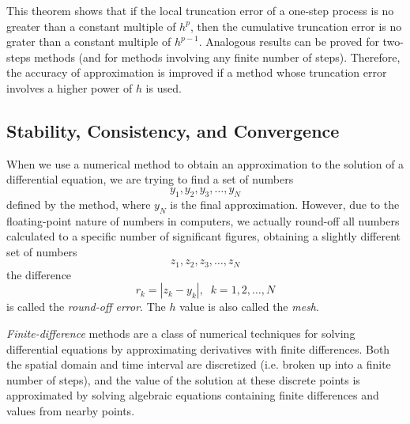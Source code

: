 \documentclass{article}
\newcounter{theorem}[section]
\newcounter{definition}[section]
\begin{document}
    This theorem shows that if the local truncation error of a one-step process is no greater than a constant multiple of $h^p$, then the cumulative truncation error is no grater than a constant multiple of $h^{p-1}$. Analogous results can be proved for two-steps methods (and for methods involving any finite number of steps). Therefore, the accuracy of approximation is improved if a method whose truncation error involves a higher power of $h$ is used. 

  \subsection{Stability, Consistency, and Convergence}

    \begin{definition}
      \label{def:round-off-errors}
    When we use a numerical method to obtain an approximation to the solution of a differential equation, we are trying to find a set of numbers 
    \begin{equation}
      y_1, y_2, y_3, \ldots, y_N
    \end{equation}
    defined by the method, where $y_N$ is the final approximation. However, due to the floating-point nature of numbers in computers, we actually round-off all numbers calculated to a specific number of significant figures, obtaining a slightly different set of numbers
    \begin{equation}
      z_1, z_2, z_3, \ldots, z_N
    \end{equation}
    the difference
    \begin{equation}
      r_k = |z_k - y_k|, \;\; k = 1, 2, \ldots, N
    \end{equation}
    is called the \textit{round-off error}. The $h$ value is also called the \textit{mesh}. 
    \end{definition}

    \begin{definition}
      \label{def:finite-difference-methods}
    \textit{Finite-difference} methods are a class of numerical techniques for solving differential equations by approximating derivatives with finite differences. Both the spatial domain and time interval are discretized (i.e. broken up into a finite number of steps), and the value of the solution at these discrete points is approximated by solving algebraic equations containing finite differences and values from nearby points. 
    \end{definition}
\end{document}
